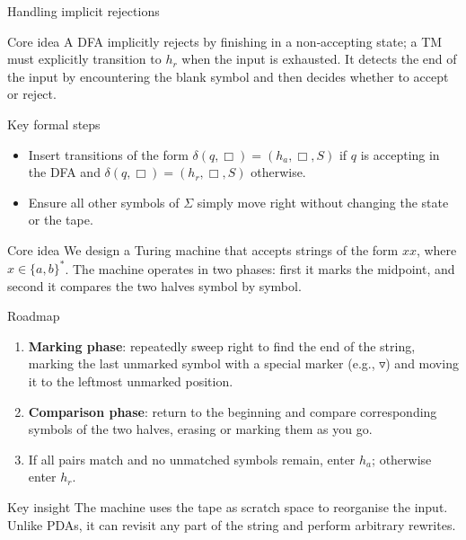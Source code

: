 \begin{frame}[t]{Handling implicit rejections}
  \begin{tblock}{Core idea}
    A DFA implicitly rejects by finishing in a non‑accepting state; a
    TM must explicitly transition to $h_r$ when the input is exhausted.
    It detects the end of the input by encountering the blank symbol
    and then decides whether to accept or reject.
  \end{tblock}
  \begin{tblock}{Key formal steps}
    \begin{itemize}
      \item Insert transitions of the form $\delta(q,\Box)=(h_a,\Box,S)$
        if $q$ is accepting in the DFA and
        $\delta(q,\Box)=(h_r,\Box,S)$ otherwise.
      \item Ensure all other symbols of $\Sigma$ simply move right
        without changing the state or the tape.
    \end{itemize}
  \end{tblock}
  \label{fr:7.2-05}
\end{frame}

\begin{frame}[t]{}
  \begin{tblock}{Core idea}
    We design a Turing machine that accepts strings of the form
    $xx$, where $x\in \{a,b\}^*$.  The machine operates in two
    phases: first it marks the midpoint, and second it compares the two
    halves symbol by symbol.
  \end{tblock}
  \begin{tblock}{Roadmap}
    \begin{enumerate}
      \item \textbf{Marking phase}: repeatedly sweep right to find the end
        of the string, marking the last unmarked symbol with a special
        marker (e.g., $\triangledown$) and moving it to the leftmost
        unmarked position.
      \item \textbf{Comparison phase}: return to the beginning and
        compare corresponding symbols of the two halves, erasing or
        marking them as you go.
      \item If all pairs match and no unmatched symbols remain, enter
        $h_a$; otherwise enter $h_r$.
    \end{enumerate}
  \end{tblock}
  \begin{talert}{Key insight}
    The machine uses the tape as scratch space to reorganise the input.
    Unlike PDAs, it can revisit any part of the string and perform
    arbitrary rewrites.
  \end{talert}
  \label{fr:7.2-06}
\end{frame}

